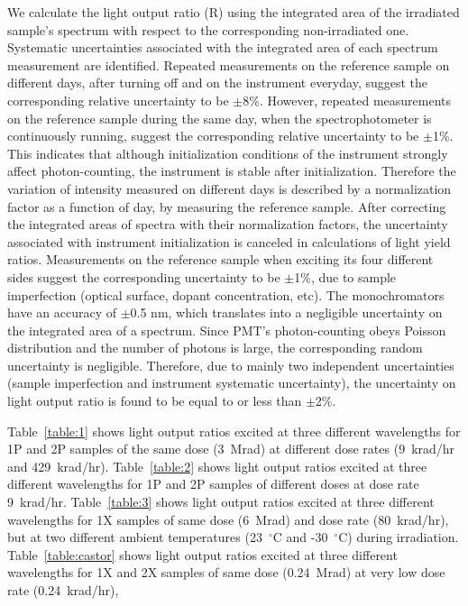 \documentclass[review]{elsarticle}
\begin{document}
We calculate the light output ratio (R) using the integrated area of the irradiated sample's spectrum 
with respect to the corresponding non-irradiated one. 
Systematic uncertainties associated with the integrated area of each spectrum measurement are identified. 
Repeated measurements on the reference sample on different days, after turning off and on the instrument everyday, 
suggest the corresponding relative uncertainty to be $\pm$8\%. 
However, repeated measurements on the reference sample during the same day, when the spectrophotometer is continuously running, 
suggest the corresponding relative uncertainty to be $\pm$1\%. 
This indicates that although initialization conditions of the instrument strongly affect photon-counting, 
the instrument is stable after initialization.
Therefore the variation of intensity measured on different days is described by a normalization factor as a function of day, 
by measuring the reference sample. 
After correcting the integrated areas of spectra with their normalization factors, 
the uncertainty associated with instrument initialization is canceled in calculations of light yield ratios. 
Measurements on the reference sample when exciting its four different sides suggest the corresponding uncertainty to be $\pm$1\%, 
due to sample imperfection (optical surface, dopant concentration, etc). 
The monochromators have an accuracy of $\pm$0.5 nm, which translates into a negligible uncertainty on the integrated area of a spectrum. 
Since PMT's photon-counting obeys Poisson distribution and the number of photons is large, 
the corresponding random uncertainty is negligible. 
Therefore, due to mainly two independent uncertainties (sample imperfection and instrument systematic uncertainty), 
the uncertainty on light output ratio is found to be equal to or less than $\pm$2\%.

Table~\ref{table:1} shows light output ratios excited at three different wavelengths for 
1P and 2P samples of the same dose (3~Mrad) at different dose rates (9~krad/hr and 429~krad/hr). 
Table~\ref{table:2} shows light output ratios excited at three different wavelengths for 
1P and 2P samples of different doses at dose rate 9~krad/hr. 
Table~\ref{table:3} shows light output ratios excited at three different wavelengths for 
1X samples of same dose (6~Mrad) and dose rate (80~krad/hr), 
but at two different ambient temperatures (23~$^\circ$C and -30~$^\circ$C) during irradiation. 
Table~\ref{table:castor} shows light output ratios excited at three different wavelengths for 
1X and 2X samples of same dose (0.24~Mrad) at very low dose rate (0.24~krad/hr), 
\end{document}
